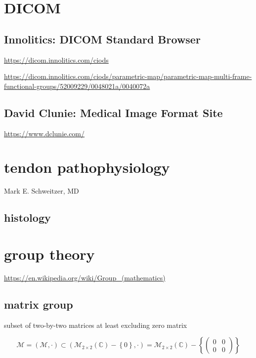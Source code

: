 \documentclass[
]{book}
\theoremstyle{definition}
\theoremstyle{definition}
\theoremstyle{definition}
\theoremstyle{definition}
\theoremstyle{remark}
\begin{document}
\chapter{DICOM}\label{dicom}

\section{Innolitics: DICOM Standard Browser}\label{innolitics-dicom-standard-browser}

\url{https://dicom.innolitics.com/ciods}

\url{https://dicom.innolitics.com/ciods/parametric-map/parametric-map-multi-frame-functional-groups/52009229/0048021a/0040072a}

\section{David Clunie: Medical Image Format Site}\label{david-clunie-medical-image-format-site}

\url{https://www.dclunie.com/}

\chapter{tendon pathophysiology}\label{tendon-pathophysiology}

Mark E. Schweitzer, MD

\section{histology}\label{histology}

\chapter{group theory}\label{group-theory}

\url{https://en.wikipedia.org/wiki/Group_(mathematics)}

\section{matrix group}\label{matrix-group}

subset of two-by-two matrices at least excluding zero matrix

\[
\mathcal{M}=\left(\mathcal{M},\cdot\right)\subset\left(\mathcal{M}_{2\times2}\left(\mathbb{C}\right)-\left\{ 0\right\} ,\cdot\right)=\mathcal{M}_{2\times2}\left(\mathbb{C}\right)-\left\{ \begin{pmatrix}0 & 0\\
0 & 0
\end{pmatrix}\right\} 
\]
\end{document}
